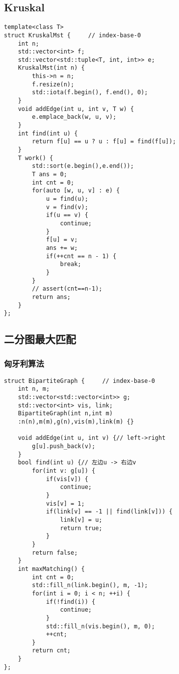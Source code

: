 \subsection{Kruskal}
\begin{lstlisting}
template<class T>
struct KruskalMst {		// index-base-0
    int n;
    std::vector<int> f;
    std::vector<std::tuple<T, int, int>> e;
    KruskalMst(int n) {
		this->n = n;
		f.resize(n);
		std::iota(f.begin(), f.end(), 0);
	}
    void addEdge(int u, int v, T w) {
        e.emplace_back(w, u, v);
    }
    int find(int u) {
        return f[u] == u ? u : f[u] = find(f[u]);
    }
    T work() {
        std::sort(e.begin(),e.end());
        T ans = 0;
        int cnt = 0;
		for(auto [w, u, v] : e) {
			u = find(u);
			v = find(v);
			if(u == v) {
				continue;
			}
			f[u] = v;
			ans += w;
			if(++cnt == n - 1) {
				break;
			}
		}
        // assert(cnt==n-1);
        return ans;
    }
};
\end{lstlisting}

\subsection{二分图最大匹配}
\subsubsection{匈牙利算法}
\begin{lstlisting}
struct BipartiteGraph {		// index-base-0
    int n, m;
    std::vector<std::vector<int>> g;
    std::vector<int> vis, link;
    BipartiteGraph(int n,int m)
	:n(n),m(m),g(n),vis(m),link(m) {}

    void addEdge(int u, int v) {// left->right
        g[u].push_back(v);
    }
    bool find(int u) {// 左边u -> 右边v
        for(int v: g[u]) {
            if(vis[v]) {
				continue;
			}
            vis[v] = 1;
            if(link[v] == -1 || find(link[v])) {
                link[v] = u;
                return true;
            }
        }
        return false;
    }
    int maxMatching() {
        int cnt = 0;
        std::fill_n(link.begin(), m, -1);
        for(int i = 0; i < n; ++i) {
            if(!find(i)) {
				continue;
			}
            std::fill_n(vis.begin(), m, 0);
            ++cnt;
        }
        return cnt;
    }
};
\end{lstlisting}

